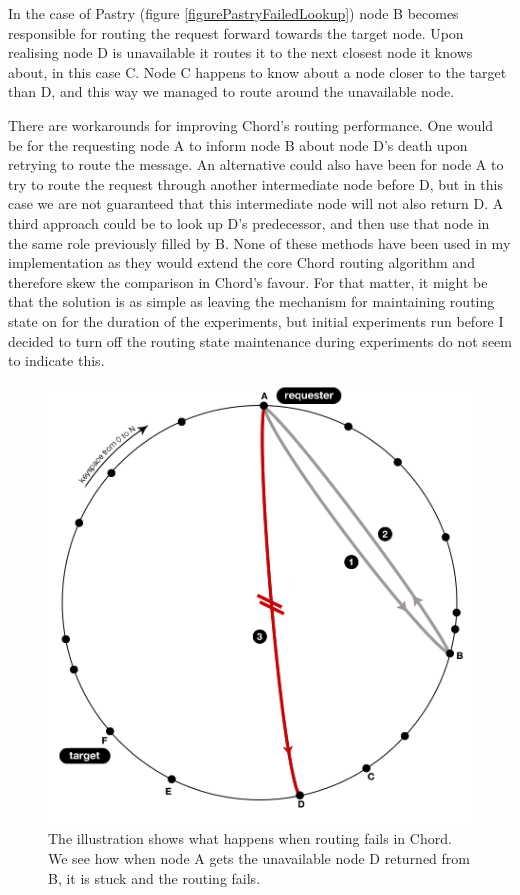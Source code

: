 In the case of Pastry (figure \ref{figurePastryFailedLookup}) node B becomes responsible for routing the request forward towards the target node. Upon realising node D is unavailable it routes it to the next closest node it knows about, in this case C. Node C happens to know about a node closer to the target than D, and this way we managed to route around the unavailable node.

There are workarounds for improving Chord's routing performance. One would be for the requesting node A to inform node B about node D's death upon retrying to route the message. An alternative could also have been for node A to try to route the request through another intermediate node before D, but in this case we are not guaranteed that this intermediate node will not also return D.
A third approach could be to look up D's predecessor, and then use that node in the same role previously filled by B. None of these methods have been used in my implementation as they would extend the core Chord routing algorithm and therefore skew the comparison in Chord's favour.
For that matter, it might be that the solution is as simple as leaving the mechanism for maintaining routing state on for the duration of the experiments, but initial experiments run before I decided to turn off the routing state maintenance during experiments do not seem to indicate this.

\begin{figure}[!htb]
\begin{center}
  \includegraphics[width=0.9\linewidth]{illustrations/ChordRoutingFailed.png}
  \caption{The illustration shows what happens when routing fails in Chord. We see how when node A gets the unavailable node D returned from B, it is stuck and the routing fails.}
  \label{figureChordFailedLookup}
\end{center}
\end{figure}

